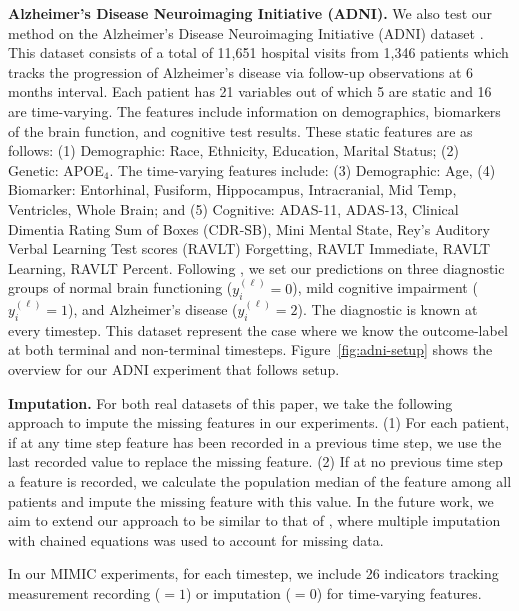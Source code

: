 \documentclass[pmlr,twocolumn,10pt]{jmlr} %
\begin{document}
\vspace{.2em}
\noindent
\textbf{Alzheimer's Disease Neuroimaging Initiative (ADNI).}
We also test our method on the Alzheimer's Disease Neuroimaging Initiative (ADNI) dataset \citep{petersen2010alzheimer}. 
This dataset consists of a total of 11,651 hospital visits from 1,346 patients which tracks the progression of Alzheimer's disease via follow-up observations at 6 months interval. 
Each patient has 21 variables out of which 5 are static and 16 are time-varying. 
The features include information on demographics, biomarkers of the brain function, and cognitive test results. 
These static features are as follows: (1) Demographic: Race, Ethnicity, Education, Marital Status; (2) Genetic: APOE$_4$.
The time-varying features include: (3) Demographic: Age, (4) Biomarker: Entorhinal, Fusiform, Hippocampus, Intracranial, Mid Temp, Ventricles, Whole Brain; and (5) Cognitive: ADAS-11, ADAS-13, Clinical Dimentia Rating Sum of Boxes (CDR-SB), Mini Mental State, Rey's Auditory Verbal Learning Test scores (RAVLT) Forgetting, RAVLT Immediate, RAVLT Learning, RAVLT Percent.
Following \citet{lee2020temporal}, we set our predictions on three diagnostic groups of normal brain functioning ($y_i^{(\ell)}=0$), mild cognitive impairment ($y_i^{(\ell)}=1$), and Alzheimer’s disease ($y_i^{(\ell)}=2$). 
The diagnostic is known at every timestep.
This dataset represent the case where we know the outcome-label at both terminal and non-terminal timesteps. 
Figure~\ref{fig:adni-setup} shows the overview for our ADNI experiment that follows \citet{lee2020temporal} setup.

\vspace{.2em}
\noindent
\textbf{Imputation.}
For both real datasets of this paper, we take the following approach to impute the missing features in our experiments. 
(1) For each patient, if at any time step feature has been recorded in a previous time step, we use the last recorded value to replace the missing feature.
(2) If at no previous time step a feature is recorded, we calculate the population median of the feature among all patients and impute the missing feature with this value.
In the future work, we aim to extend our approach to be similar to that of \citet{seymour2019derivation}, where multiple imputation with chained equations was used to account for missing data. 

In our MIMIC experiments, for each timestep, we include 26 indicators tracking measurement recording ($=1$) or imputation ($=0$) for time-varying features.
\end{document}
